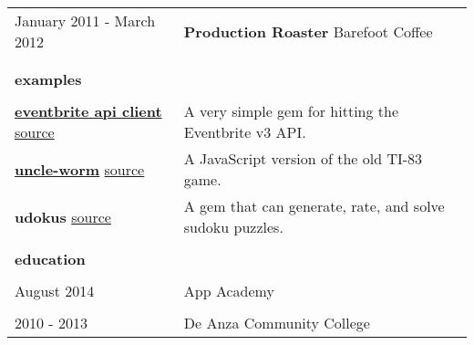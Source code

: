 \documentclass{article}
\begin{document}
\begin{tabular}{L{3cm} R{13.50cm}}
    \\
    
    January 2011 - March 2012
    &
    \textbf{Production Roaster}
    Barefoot Coffee
    
    \\\\ \hline \\

    \large{\textbf{examples}} \\\\
    \normalsize
    
    \href{https://rubygems.org/gems/eventbrite_api_client}{\large{\textbf{eventbrite api client}}}
    \newline
    \normalsize
    \href{https://github.com/kellyjospehprice/eventbrite_api_client}{source}
    
    &
    
    A very simple gem for hitting the Eventbrite v3 API. 

    \\
    
    \href{http://uncle-worm.herokuapp.com}{\large{\textbf{uncle-worm}}}
    \newline
    \normalsize
    \href{https://github.com/kellyjospehprice/uncle_worm}{source}
    
    &
    
    A JavaScript version of the old TI-83 game. 

    \\
    
    {\large{\textbf{udokus}}}
    \newline
    \normalsize
    \href{https://github.com/kellyjospehprice/udokus}{source}
    
    &
    
    A gem that can generate, rate, and solve sudoku puzzles.
    
    \\ \hline \\

    \large{\textbf{education}} \\\\
    \normalsize

    August 2014 & App Academy \\

    \\

    2010 - 2013 & De Anza Community College \\
\end{tabular}
\end{document}
